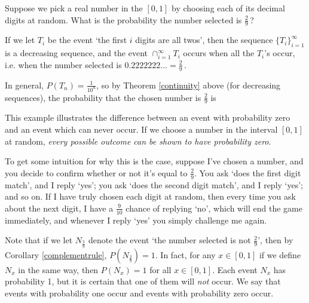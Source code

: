 \begin{examp}
Suppose we pick a real number in the $[0,1]$ by choosing each of its decimal digits at random. What is the probability the number selected is $\frac{2}{9}$\,?
\par
If we let $T_i$ be the event  `the first $i$ digits are all twos', then the sequence $\{T_i\}_{i=1}^{\infty}$ is a decreasing sequence, and the event $\cap_{i=1}^{\infty}T_i$ occurs when all the $T_i$'s occur, i.e. when the number selected is $0.2222222\dots = \frac{2}{9}$\,.
\par
In general, $P(T_n) = \frac{1}{10^n}$, so by Theorem \ref{continuity} above (for decreasing sequences), the probability that the chosen number is $\frac{2}{9}$ is
\end{examp}
\par
This example illustrates the difference between an event with probability zero and an event which can never occur. If we choose a number in the interval $[0,1]$ at random, \emph{every possible outcome can be shown to have probability zero}.
\par
To get some intuition for why this is the case, suppose I've chosen a number, and you decide to confirm whether or not it's equal to $\frac{2}{9}$. You ask `does the first digit match', and I reply `yes'; you ask `does the second digit match', and I reply `yes'; and so on. If I have truly chosen each digit at random, then every time you ask about the next digit, I have a $\frac{9}{10}$ chance of replying `no', which will end the game immediately, and whenever I reply `yes' you simply challenge me again.
\par
Note that if we let $N_{\frac{2}{9}}$ denote the event `the number selected is not $\frac{2}{9}$', then by Corollary \ref{complementrule}, $P(N_{\frac{2}{9}}) = 1$. In fact, for any $x \in [0,1]$ if we define $N_x$ in the same way, then $P(N_x) = 1$ for all $x \in [0,1]$. Each event $N_x$ has probability 1, but it is certain that one of them will \emph{not} occur. We say that events with probability one  occur and events with probability zero  occur.
